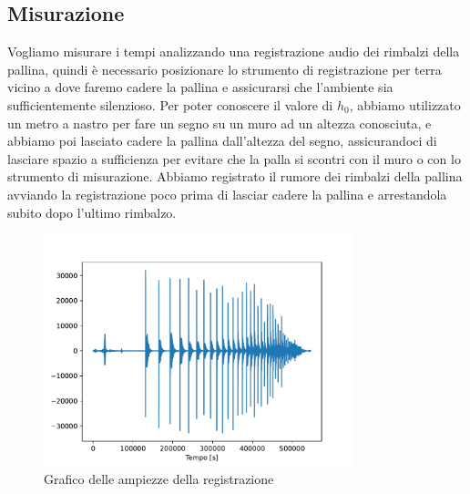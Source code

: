 \documentclass[a4paper]{article}
\begin{document}
    \subsection{Misurazione}
    Vogliamo misurare i tempi analizzando una registrazione audio dei rimbalzi della pallina,
    quindi è necessario posizionare lo strumento di registrazione per terra vicino
    a dove faremo cadere la pallina e assicurarsi che l'ambiente sia sufficientemente silenzioso.
    Per poter conoscere il valore di $h_0$, abbiamo utilizzato un metro a nastro per
    fare un segno su un muro ad un altezza conosciuta, e abbiamo poi lasciato cadere
    la pallina dall'altezza del segno, assicurandoci di lasciare spazio a sufficienza per evitare
    che la palla si scontri con il muro o con lo strumento di misurazione.
    Abbiamo registrato il rumore dei rimbalzi della pallina avviando
    la registrazione poco prima di lasciar cadere la pallina e arrestandola subito dopo l'ultimo rimbalzo.
    \begin{figure}[!htb]
        \centering
        \includegraphics[width=0.8\textwidth]{extra/audio_rimbalzi.pdf}
        \caption{Grafico delle ampiezze della registrazione}
        \label{fig:ampiezze}
    \end{figure}
\end{document}
